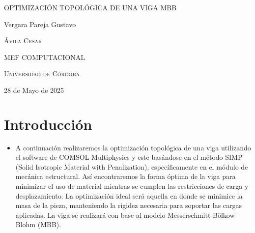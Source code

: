\documentclass{article}
\author{Gustavo Vergara}
\theoremstyle{mytheoremstyle}
\theoremstyle{mytheoremstyle}
\theoremstyle{myproblemstyle}
\begin{document}

\begin{titlepage}
    \centering
    \vspace{2.5cm}
    {\scshape \Large OPTIMIZACIÓN TOPOLÓGICA DE UNA VIGA MBB\par}
    \vspace{5cm}
    \textbf\large\scshape{\par}
    \vspace{0.5cm}
    {\Large Vergara Pareja Gustavo\par}
    \vspace{5cm}
    {\scshape\Large Ávila Cesar\par}
    \vspace{0.3cm}
    {\scshape\Large MEF COMPUTACIONAL \par}
    \vspace{0.3cm}
    {\scshape\Large Universidad de Córdoba\par}
    \vspace{0.3cm}
    {\Large 28 de Mayo de 2025 \par}
\end{titlepage}
\tableofcontents
\newpage
\section{Introducción}
\begin{itemize}
    \item A continuación realizaremos la optimización topológica de una viga utilizando el software de COMSOL Multiphysics y este basándose en el método SIMP (Solid Isotropic Material with Penalization), específicamente en el módulo de mecánica estructural. Así encontraremos la forma óptima de la viga para minimizar el uso de material mientras se cumplen las restricciones de carga y desplazamiento. La optimización ideal será aquella en donde se minimice la masa de la pieza, manteniendo la rigidez necesaria para soportar las cargas aplicadas. La viga se realizará con base al modelo Messerschmitt-Bölkow-Blohm (MBB).
\end{itemize}
\end{document}
